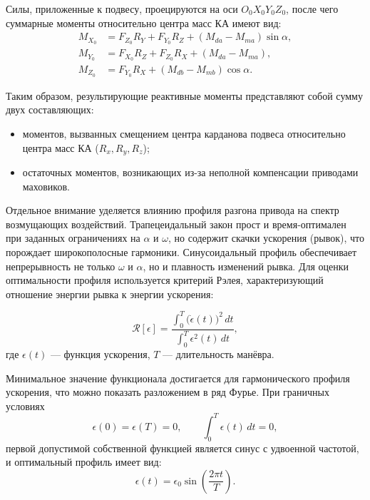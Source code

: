 Силы, приложенные к подвесу, проецируются на оси $O_0X_0Y_0Z_0$, после чего суммарные моменты относительно центра масс КА имеют вид:
\begin{equation*}
	\begin{aligned}
		M_{X_0} &= F_{Z_0}R_Y + F_{Y_0}R_Z + (M_{da}-M_{ma})\sin\alpha, \\
		M_{Y_0} &= F_{X_0}R_Z + F_{Z_0}R_X + (M_{da}-M_{ma}), \\
		M_{Z_0} &= F_{Y_0}R_X + (M_{db}-M_{mb})\cos\alpha.
	\end{aligned}
\end{equation*}

Таким образом, результирующие реактивные моменты представляют собой сумму двух составляющих: 
\begin{itemize}
	\item моментов, вызванных смещением центра карданова подвеса относительно центра масс КА ($R_x, R_y, R_z$);
	\item остаточных моментов, возникающих из-за неполной компенсации приводами маховиков.
\end{itemize}


Отдельное внимание уделяется влиянию профиля разгона привода на спектр возмущающих воздействий. Трапецеидальный закон прост и время-оптимален при заданных ограничениях на $\alpha$ и $\omega$, но содержит скачки ускорения (рывок), что порождает широкополосные гармоники. Синусоидальный профиль обеспечивает непрерывность не только $\omega$ и $\alpha$, но и плавность изменений рывка. 
Для оценки оптимальности профиля используется критерий Рэлея, характеризующий отношение энергии рывка к энергии ускорения:

\begin{equation*}
	\label{eq:relay}
	\mathcal{R}[\epsilon] =
	\frac{\displaystyle \int_{0}^{T} \bigl(\dot{\epsilon}(t)\bigr)^{2}\,dt}
	{\displaystyle \int_{0}^{T} \epsilon^{2}(t)\,dt},
\end{equation*}
где $\epsilon(t)$ --- функция ускорения, $T$ --- длительность манёвра.

Минимальное значение функционала достигается для гармонического профиля ускорения, что можно показать разложением в ряд Фурье. 
При граничных условиях
\begin{equation*}
	\epsilon(0) = \epsilon(T) = 0, 
	\qquad 
	\int_{0}^{T} \epsilon(t)\,dt = 0,
\end{equation*}
первой допустимой собственной функцией является синус с удвоенной частотой, и оптимальный профиль имеет вид:
\begin{equation*}
	\epsilon(t) = \epsilon_0 \sin\!\left(\frac{2\pi t}{T}\right).
\end{equation*}


